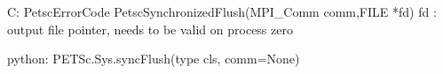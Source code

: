 C:
PetscErrorCode  PetscSynchronizedFlush(MPI_Comm comm,FILE *fd)
fd : output file pointer, needs to be valid on process zero

python:
PETSc.Sys.syncFlush(type cls, comm=None)
